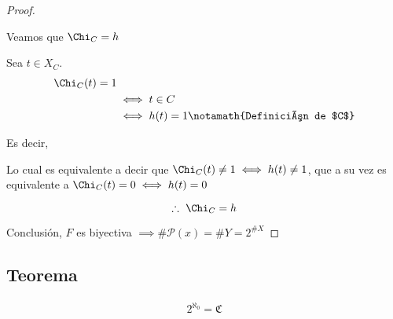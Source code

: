 \begin{proof}
\begin{itemize}
           \bigskip
           Veamos que $\Chi_C = h$

           Sea $t \in X_C$.
           \begin{align*}
               \Chi_C (t) = 1 & \\
               & \iff t \in C \\
               & \iff h(t) = 1 \notamath{Definición de $C$} \\
            \end{align*}

            Es decir, 

            Lo cual es equivalente a decir que 
            $\Chi_C (t) \neq 1 \iff h(t)\neq 1$, que a su vez es equivalente a
            $\Chi_C (t) = 0 \iff h(t) = 0$

            \[ \therefore ~ \Chi_C = h \]
    \end{itemize}
    Conclusión, $F$ es biyectiva 
    $\implies \# \mathcal{P}(x) = \# Y = 2^{\# X}$

\end{proof}


\subsection{Teorema}

\begin{teorema}{}{}
    \begin{gather*}
        2^{\aleph_0} = \mathfrak{C}
    \end{gather*}
\end{teorema}

